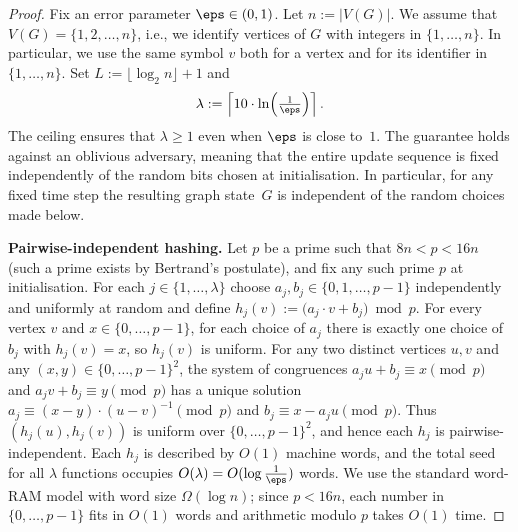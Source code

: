 \begin{proof}
Fix an error parameter $\eps\in(0,1)$.
Let $n := |V(G)|$.
We assume that $V(G)=\{1,2,\dots,n\}$, i.e., we identify vertices of $G$ with
integers in $\{1,\dots,n\}$.
In particular, we use the same symbol $v$ both for a vertex and for its
identifier in $\{1,\dots,n\}$.
Set $L := \lfloor \log_2 n\rfloor + 1$ and
\[
\lambda
:= \left\lceil 10 \cdot
\ln\!\left(\tfrac{1}{\eps}\right)\right\rceil.
\]
The ceiling ensures that $\lambda\ge 1$ even when $\eps$ is close to~$1$.
The guarantee holds against an oblivious adversary, meaning that the entire
update sequence is fixed independently of the random bits chosen at
initialisation. In particular, for any fixed time step the resulting graph
state~$G$ is independent of the random choices made below.

\smallskip
\noindent\textbf{Pairwise-independent hashing.}
Let $p$ be a prime such that $8n < p < 16n$
(such a prime exists by Bertrand's postulate),
and fix any such prime $p$ at initialisation.
For each $j\in\{1,\dots,\lambda\}$ choose $a_j,b_j\in\{0,1,\dots,p-1\}$
independently and uniformly at random and define
$h_j(v) := \bigl(a_j\cdot v+b_j\bigr)\bmod p$.
For every vertex $v$ and $x\in\{0,\dots,p-1\}$, for each choice of $a_j$ there
is exactly one choice of $b_j$ with $h_j(v)=x$, so $h_j(v)$ is uniform.
For any two distinct vertices $u,v$ and any $(x,y)\in\{0,\dots,p-1\}^2$, the
system of congruences $a_j u+b_j\equiv x\pmod p$ and
$a_j v+b_j\equiv y\pmod p$ has a unique solution
$a_j\equiv (x-y)\cdot (u-v)^{-1}\pmod p$ and $b_j\equiv x-a_j u\pmod p$.
Thus $(h_j(u),h_j(v))$ is uniform over $\{0,\dots,p-1\}^2$, and hence each $h_j$
is pairwise-independent.
Each $h_j$ is described by $O(1)$ machine words, and the total seed for all
$\lambda$ functions occupies $O(\lambda)=O(\log\frac{1}{\eps})$ words.
We use the standard word-RAM model with word size $\Omega(\log n)$; since
$p<16n$, each number in $\{0,\dots,p-1\}$ fits in $O(1)$ words and arithmetic
modulo $p$ takes $O(1)$ time.


\end{proof}
